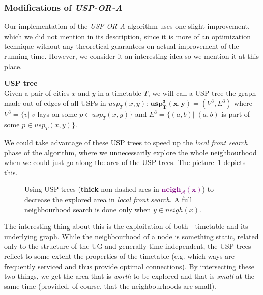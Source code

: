 	\subsubsection{Modifications of \textit{USP-OR-A}}
	
		\noindent Our implementation of the \textit{USP-OR-A} algorithm uses one slight improvement, which we did not mention in its description, since it is more of an optimization technique without any theoretical guarantees on actual improvement of the running time. However, we consider it an interesting idea so we mention it at this place.
		
		\begin{definition}
	        \textbf{USP tree} \\
			Given a pair of cities $x$ and $y$ in a timetable $T$, we will call a USP tree the graph made out of edges of all USPs in $usp_{T}(x, y)$: $\bm{usp^{3}_{T}(x, y)} = (V^{3}, E^{3})$ where $V^{3} = \{v| \; v$ lays on some $p \in usp_{T}(x, y)\}$ and $E^{3} = \{(a, b)| \; (a, b)$ is part of some $p \in usp_{T}(x, y)\}$.
	    \end{definition}
	    
	    \noindent We could take advantage of these USP trees to speed up the \textit{local front search} phase of the algorithm, where we unnecessarily explore the whole neighbourhood when we could just go along the arcs of the USP trees. The picture~\ref{fig:uspora3} depicts this. \\
	    
	    \begin{figure}[h!]
			\begin{center}
			\end{center}
			\caption{\label{fig:uspora3} Using USP trees (\textbf{thick} non-dashed arcs in \textcolor{purple}{$\bm{neigh_{\mathcal{A}}(x)}$}) to decrease the explored area in \textit{local front search}. A full neighbourhood search is done only when $y \in neigh(x)$.}
		\end{figure}
		
		\noindent The interesting thing about this is the exploitation of both - timetable and its underlying graph. While the neighbourhood of a node is something static, related only to the structure of the UG and generally time-independent, the USP trees reflect to some extent the properties of the timetable (e.g. which ways are frequently serviced and thus provide optimal connections). By intersecting these two things, we get the area that is \textit{worth} to be explored and that is \textit{small} at the same time (provided, of course, that the neighbourhoods are small).	    
	 

